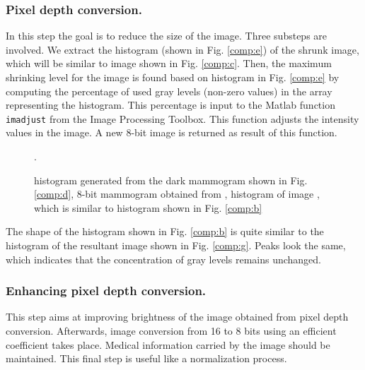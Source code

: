 \subsubsection{Pixel depth conversion.} 

In this step the goal is to reduce the size of the image. Three substeps are
involved. We extract the histogram (shown in Fig. \ref{comp:e}) of the shrunk
image, which will be similar to image shown in Fig. \ref{comp:c}. Then, the
maximum shrinking level for the image is found based on histogram in Fig.
\ref{comp:e} by computing the percentage of used gray levels (non-zero values)
in the array representing the histogram. This percentage is input to the Matlab
function \texttt{imadjust} from the Image Processing Toolbox. This function
adjusts the intensity values in the image. A new 8-bit image is returned as
result of this function. 

\begin{figure}[h]
  \begin{center}
    \hspace{12pt}
    \hspace{12pt}
  \end{center}

  \caption{\protect{} histogram generated from the dark mammogram
  shown in Fig. \protect\ref{comp:d}, \protect{}  8-bit mammogram
  obtained from \protect{}, \protect{} histogram of
  image \protect{}, which is similar to histogram shown in Fig.
  \ref{comp:b}}. 
  
  \label{img:shrinking-two} 
\end{figure}

The shape of the histogram shown in Fig. \ref{comp:b} is quite similar
to the histogram of the resultant image shown in Fig. \ref{comp:g}. Peaks look
the same, which indicates that the concentration of gray levels remains
unchanged.

\subsubsection{Enhancing pixel depth conversion.}

This step aims at improving brightness of the image obtained from pixel depth
conversion. Afterwards, image conversion from 16 to 8 bits using an efficient
coefficient takes place. Medical information carried by the image should be
maintained. This final step is useful like a normalization process. 

